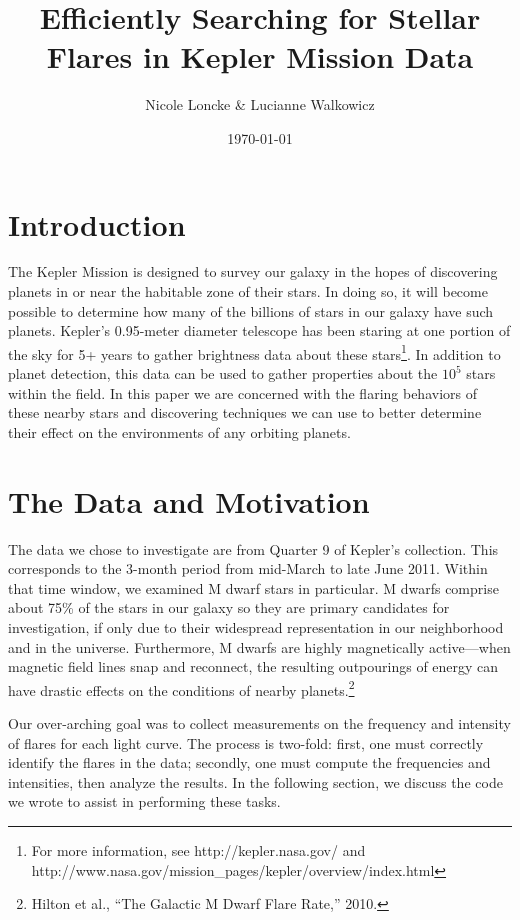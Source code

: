 \documentclass[11pt]{article}
\author{Nicole Loncke \& Lucianne Walkowicz}
\date{\today}
\title{Efficiently Searching for Stellar Flares in Kepler Mission Data}
\begin{document}
\maketitle{}

\section{Introduction}
\label{sec:intro}
The Kepler Mission is designed to survey our galaxy in the hopes of
discovering planets in or near the habitable zone of their stars.  In
doing so, it will become possible to determine how many of the
billions of stars in our galaxy have such planets. Kepler's 0.95-meter
diameter telescope has been staring at one portion of the sky for 5+
years to gather brightness data about these stars\footnote{For more
  information, see http://kepler.nasa.gov/ and
  http://www.nasa.gov/mission\_pages/kepler/overview/index.html}.  In
addition to planet detection, this data can be used to gather
properties about the $10^5$ stars within the field.  In this paper we
are concerned with the flaring behaviors of these nearby stars and
discovering techniques we can use to better determine their effect on
the environments of any orbiting planets.

\section{The Data and Motivation}
\label{sec:data}
The data we chose to investigate are from Quarter 9 of Kepler's
collection.  This corresponds to the 3-month period from mid-March to
late June 2011.  Within that time window, we examined M dwarf stars in
particular.  M dwarfs comprise about 75\% of the stars in our galaxy
so they are primary candidates for investigation, if only due to their
widespread representation in our neighborhood and in the universe.
Furthermore, M dwarfs are highly magnetically active---when magnetic
field lines snap and reconnect, the resulting outpourings of energy
can have drastic effects on the conditions of nearby
planets.\footnote{Hilton et al., ``The Galactic M Dwarf Flare Rate,''
  2010.}

Our over-arching goal was to collect measurements on the frequency and
intensity of flares for each light curve.  The process is two-fold:
first, one must correctly identify the flares in the data; secondly,
one must compute the frequencies and intensities, then analyze the
results.  In the following section, we discuss the code we wrote to
assist in performing these tasks.
\end{document}
